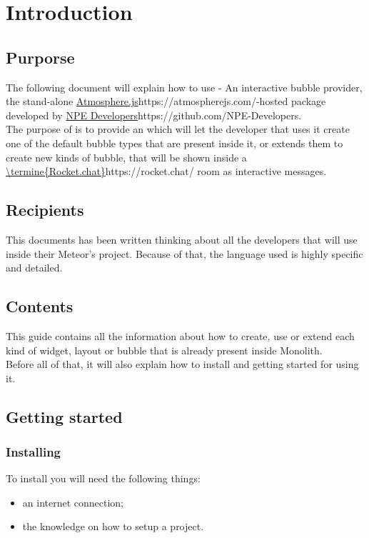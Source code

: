 \section{Introduction}
\subsection{Purporse}
The following document will explain how to use  - An interactive bubble provider, the stand-alone \url{Atmosphere.js}{https://atmospherejs.com/}-hosted package developed by \url{NPE Developers}{https://github.com/NPE-Developers}. \\

The purpose of  is to provide an  which will let the developer that uses it create one of the default bubble types that are present inside it, or extends them to create new kinds of bubble, that will be shown inside a \url{\termine{Rocket.chat}}{https://rocket.chat/} room as interactive messages.

\subsection{Recipients}
This documents has been written thinking about all the developers that will use  inside their Meteor's project. Because of that, the language used is highly specific and detailed.

\subsection{Contents}
This guide contains all the information about how to create, use or extend each kind of widget, layout or bubble that is already present inside Monolith. \\
Before all of that, it will also explain how to install  and getting started for using it.

\subsection{Getting started}
\subsubsection{Installing }
To install  you will need the following things:
\begin{itemize}
	\item an internet connection;
	\item the knowledge on how to setup a  project.
\end{itemize}

